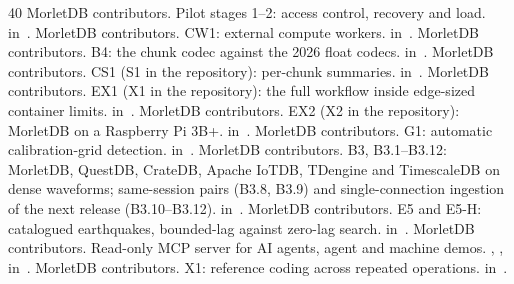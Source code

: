 \documentclass[sigconf,nonacm]{acmart}
\newcommand{\M}{MorletDB}
\begin{document}
\begin{thebibliography}{40}
 \M{} contributors. Pilot stages 1--2: access control, recovery and load.  in~\cite{repo}.
 \M{} contributors. CW1: external compute workers.  in~\cite{repo}.
 \M{} contributors. B4: the chunk codec against the 2026 float codecs.  in~\cite{repo}.
 \M{} contributors. CS1 (S1 in the repository): per-chunk summaries.  in~\cite{repo}.
 \M{} contributors. EX1 (X1 in the repository): the full workflow inside edge-sized container limits.  in~\cite{repo}.
 \M{} contributors. EX2 (X2 in the repository): \M{} on a Raspberry Pi 3B+.  in~\cite{repo}.
 \M{} contributors. G1: automatic calibration-grid detection.  in~\cite{repo}.
 \M{} contributors. B3, B3.1--B3.12: \M{}, QuestDB, CrateDB, Apache IoTDB, TDengine and TimescaleDB on dense waveforms; same-session pairs (B3.8, B3.9) and single-connection ingestion of the next release (B3.10--B3.12).  in~\cite{repo}.
 \M{} contributors. E5 and E5-H: catalogued earthquakes, bounded-lag against zero-lag search.  in~\cite{repo}.
 \M{} contributors. Read-only MCP server for AI agents, agent and machine demos. , ,  in~\cite{repo}.
 \M{} contributors. X1: reference coding across repeated operations.  in~\cite{repo}.
\end{thebibliography}
\end{document}
